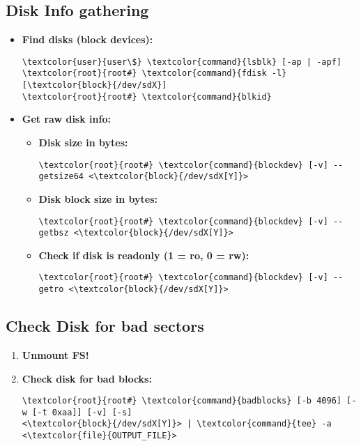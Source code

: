 \documentclass[10pt, a4paper, onecolumn, openany]{book} %
\begin{document}
\subsection{Disk Info gathering}
\label{disk_info_gathering}
\begin{itemize}
    \item \textbf{Find disks (block devices):}
\begin{Verbatim}[commandchars=\\\{\}]
\textcolor{user}{user\$} \textcolor{command}{lsblk} [-ap | -apf]
\textcolor{root}{root#} \textcolor{command}{fdisk -l} [\textcolor{block}{/dev/sdX}]
\textcolor{root}{root#} \textcolor{command}{blkid}
\end{Verbatim}
    \item \textbf{Get raw disk info:}
    \begin{itemize}
        \item \textbf{Disk size in bytes:}
\begin{Verbatim}[commandchars=\\\{\}]
\textcolor{root}{root#} \textcolor{command}{blockdev} [-v] --getsize64 <\textcolor{block}{/dev/sdX[Y]}>
\end{Verbatim}        
    \item \textbf{Disk block size in bytes:}
\begin{Verbatim}[commandchars=\\\{\}]
\textcolor{root}{root#} \textcolor{command}{blockdev} [-v] --getbsz <\textcolor{block}{/dev/sdX[Y]}>
\end{Verbatim}
    \item \textbf{Check if disk is readonly (1 = ro, 0 = rw):}
\begin{Verbatim}[commandchars=\\\{\}]
\textcolor{root}{root#} \textcolor{command}{blockdev} [-v] --getro <\textcolor{block}{/dev/sdX[Y]}>
\end{Verbatim}
    \end{itemize}
\end{itemize}
\subsection{Check Disk for bad sectors}
\begin{enumerate}
    \item \textbf{Unmount FS!}
    \item \textbf{Check disk for bad blocks:}
\begin{Verbatim}[commandchars=\\\{\}]
\textcolor{root}{root#} \textcolor{command}{badblocks} [-b 4096] [-w [-t 0xaa]] [-v] [-s] 
<\textcolor{block}{/dev/sdX[Y]}> | \textcolor{command}{tee} -a <\textcolor{file}{OUTPUT_FILE}>
\end{Verbatim}
\end{enumerate}
\end{document}
